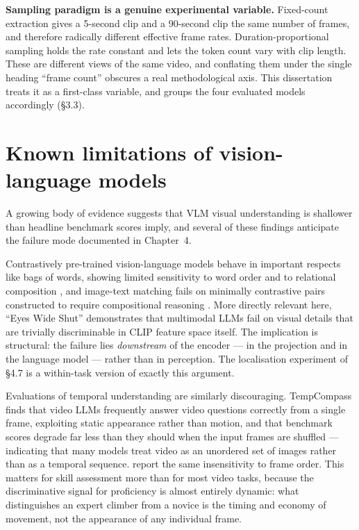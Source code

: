 \documentclass[logo,msc]{infthesis}
\newcommand{\runin}[1]{\par\medskip\noindent\textbf{#1}}
\begin{document}
\runin{Sampling paradigm is a genuine experimental variable.}
Fixed-count extraction gives a 5-second clip and a 90-second clip the same
number of frames, and therefore radically different effective frame rates.
Duration-proportional sampling holds the rate constant and lets the token
count vary with clip length. These are different views of the same video,
and conflating them under the single heading ``frame count'' obscures a
real methodological axis. This dissertation treats it as a first-class
variable, and groups the four evaluated models accordingly (§3.3).

\section{Known limitations of vision-language models}

A growing body of evidence suggests that VLM visual understanding is
shallower than headline benchmark scores imply, and several of these
findings anticipate the failure mode documented in Chapter~4.

Contrastively pre-trained vision-language models behave in important
respects like bags of words, showing limited sensitivity to word order and
to relational composition \citep{yuksekgonul2023}, and image-text matching
fails on minimally contrastive pairs constructed to require compositional
reasoning \citep{thrush2022}. More directly relevant here, ``Eyes Wide
Shut'' \citep{tong2024} demonstrates that multimodal LLMs fail on visual
details that are trivially discriminable in CLIP feature space itself. The
implication is structural: the failure lies \emph{downstream} of the
encoder --- in the projection and in the language model --- rather than in
perception. The localisation experiment of §4.7 is a within-task version
of exactly this argument.

Evaluations of temporal understanding are similarly discouraging.
TempCompass \citep{liu2024tempcompass} finds that video LLMs frequently
answer video questions correctly from a single frame, exploiting static
appearance rather than motion, and that benchmark scores degrade far less
than they should when the input frames are shuffled --- indicating that
many models treat video as an unordered set of images rather than as a
temporal sequence. \citet{feng2025} report the same insensitivity to frame
order. This matters for skill assessment more than for most video tasks,
because the discriminative signal for proficiency is almost entirely
dynamic: what distinguishes an expert climber from a novice is the timing
and economy of movement, not the appearance of any individual frame.
\end{document}
